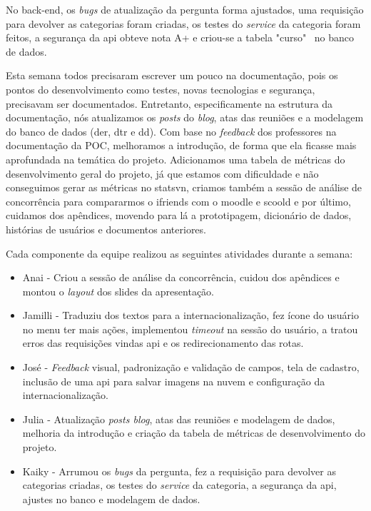 No \gls{back-end}, os \textit{bugs} de atualização da pergunta forma ajustados, uma requisição para devolver as categorias foram criadas, os testes do \textit{service} da categoria foram feitos, a segurança da \acs{api} obteve nota A+ e criou-se a tabela "curso" \, no banco de dados.

Esta semana todos precisaram escrever um pouco na documentação, pois os pontos do desenvolvimento como testes, novas tecnologias e segurança, precisavam ser documentados. Entretanto, especificamente na estrutura da documentação, nós atualizamos os \textit{posts} do \textit{blog}, atas das reuniões e a modelagem do banco de dados (\acs{der}, \acs{dtr} e \acs{dd}). Com base no \textit{feedback} dos professores na documentação da \acs{POC},  melhoramos a introdução, de forma que ela ficasse mais aprofundada na temática do projeto. Adicionamos uma tabela de métricas do desenvolvimento geral do projeto, já que estamos com dificuldade e não conseguimos gerar as métricas no \gls{statsvn}, criamos também a sessão de análise de concorrência para compararmos o \gls{ifriends} com o \gls{moodle} e \gls{scoold} e por último, cuidamos dos apêndices, movendo para lá a prototipagem, dicionário de dados, histórias de usuários e documentos anteriores.

Cada componente da equipe realizou as seguintes atividades durante a semana:

\begin{itemize}
    \item Anai - Criou a sessão de análise da concorrência, cuidou dos apêndices e montou o \textit{layout} dos slides da apresentação.  
    \item Jamilli - Traduziu dos textos para  a internacionalização, fez ícone do usuário no menu ter mais ações, implementou \textit{timeout} na sessão do usuário, a tratou erros das requisições vindas \acs{api} e os redirecionamento das rotas.
    \item José - \textit{Feedback} visual, padronização e validação de campos, tela de cadastro, inclusão de uma \acs{api} para salvar imagens na nuvem e configuração da internacionalização.  
    \item Julia - Atualização \textit{posts blog}, atas das reuniões e modelagem de dados, melhoria da introdução e criação da tabela de métricas de desenvolvimento do projeto.
    \item Kaiky - Arrumou os \textit{bugs} da pergunta, fez a requisição para devolver as categorias criadas, os testes do \textit{service} da categoria, a segurança da \acs{api}, ajustes no banco e modelagem de dados. 
\end{itemize}

